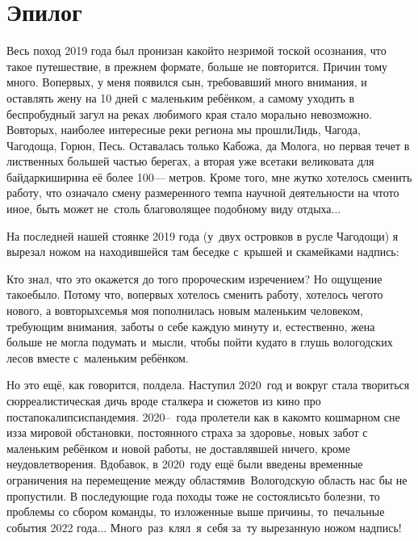 {
\cleardoublepage
{}

\fancyhead[LE]{\fancyplain{}{}}
\fancyhead[RO]{\fancyplain{}{}}

\section*{Эпилог}
Весь поход 2019 года был пронизан какой\sdash то незримой тоской осознания, что такое путешествие, в прежнем формате, больше не повторится. Причин тому много. Во\sdash первых, у меня появился сын, требовавший много внимания, и оставлять жену на 10 дней с маленьким ребёнком, а самому уходить в беспробудный загул на реках любимого края стало морально невозможно. Во\sdash вторых, наиболее интересные реки региона мы прошли\mdash Лидь, Чагода, Чагодоща, Горюн, Песь. Оставалась только Кабожа, да Молога, но первая течет в лиственных большей частью берегах, а вторая уже все\sdash таки великовата для байдарки\mdash ширина её более 100\thinspace\nobreakdash--- метров. Кроме того, мне жутко хотелось сменить работу, что означало смену размеренного темпа научной деятельности на что\sdash то иное, быть может не~столь благоволящее подобному виду отдыха$\ldots$ 

На последней нашей стоянке 2019 года (у~двух островков в русле Чагодощи) я вырезал ножом на находившейся там беседке с~крышей и скамейками надпись:

{\centering\Large{}}

Кто знал, что это окажется до того пророческим изречением? Но ощущение такое\mdash было. Потому что, во\sdash первых хотелось сменить работу, хотелось чего\sdash то нового, а во\sdash вторых\mdash семья моя пополнилась новым маленьким человеком, требующим внимания, заботы о себе каждую минуту и, естественно, жена больше не могла подумать и~мысли, чтобы пойти куда\sdash то в глушь вологодских лесов вместе с~маленьким ребёнком.

Но это ещё, как говорится, полдела. Наступил 2020~год и вокруг стала твориться сюрреалистическая дичь вроде сталкера и сюжетов из кино про постапокалипсис\mdash пандемия. 2020\thinspace\nobreakdash--~года пролетели как в каком\sdash то кошмарном сне из\sdash за мировой обстановки, постоянного страха за здоровье, новых забот с маленьким ребёнком и новой работы, не доставлявшей ничего, кроме неудовлетворения. Вдобавок, в 2020~году ещё были введены временные ограничения на перемещение между областями\mdash в~Вологодскую область нас бы не пропустили. В последующие года походы тоже не состоялись\mdash то болезни, то проблемы со сбором команды, то изложенные выше причины, то~печальные события 2022 года$\ldots$ Много~раз~клял~я~себя за~ту вырезанную ножом надпись!

}
